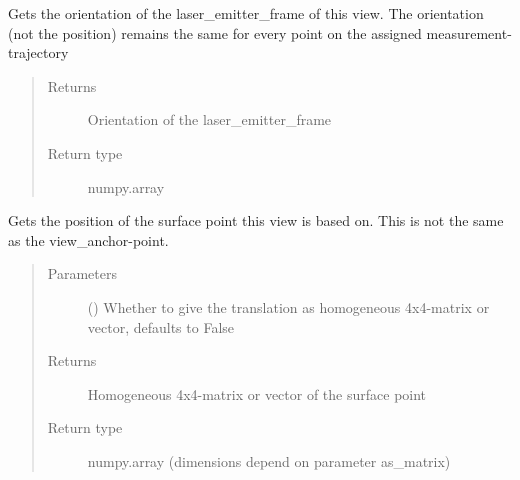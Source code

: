 \documentclass[letterpaper,10pt,english]{sphinxmanual}
\begin{document}
\begin{fulllineitems}
\begin{fulllineitems}
\end{fulllineitems}


\begin{fulllineitems}
\label{\detokenize{module_view:agiprobot_measurement.view.View.get_orientation_matrix}}
Gets the orientation of the laser\_emitter\_frame of this view. The orientation (not the position) remains the same for every point on the assigned measurement-trajectory
\begin{quote}\begin{description}
\item[{Returns}] \leavevmode
Orientation of the laser\_emitter\_frame

\item[{Return type}] \leavevmode
numpy.array

\end{description}\end{quote}

\end{fulllineitems}


\begin{fulllineitems}
\label{\detokenize{module_view:agiprobot_measurement.view.View.get_surface_point}}
Gets the position of the surface point this view is based on. This is not the same as the view\_anchor-point.
\begin{quote}\begin{description}
\item[{Parameters}] \leavevmode
{} (\sphinxstyleliteralemphasis{, }) \textendash{} Whether to give the translation as homogeneous 4x4-matrix or vector, defaults to False

\item[{Returns}] \leavevmode
Homogeneous 4x4-matrix or vector of the surface point

\item[{Return type}] \leavevmode
numpy.array (dimensions depend on parameter as\_matrix)

\end{description}\end{quote}


\end{fulllineitems}
\end{fulllineitems}
\end{document}
